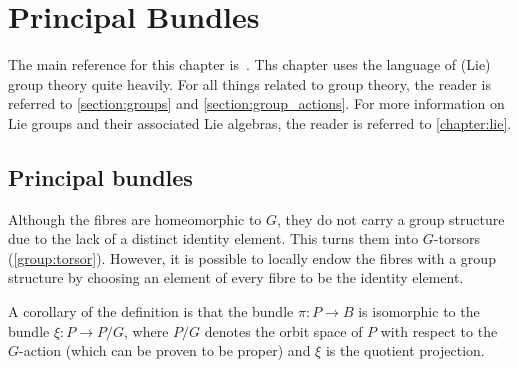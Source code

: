\chapter{Principal Bundles}\label{chapter:principal_bundles}

    The main reference for this chapter is~\citet{sontz_principal_2015}. Ths chapter uses the language of (Lie) group theory quite heavily. For all things related to group theory, the reader is referred to \cref{section:groups} and \cref{section:group_actions}. For more information on Lie groups and their associated Lie algebras, the reader is referred to \cref{chapter:lie}.

    \minitoc

\section{Principal bundles}

    \begin{remark}[$G$-torsor]\label{bundle:fibre_torsor}
        Although the fibres are homeomorphic to $G$, they do not carry a group structure due to the lack of a distinct identity element. This turns them into $G$-torsors (\cref{group:torsor}). However, it is possible to locally endow the fibres with a group structure by choosing an element of every fibre to be the identity element.
    \end{remark}

    \begin{property}
        A corollary of the definition is that the bundle $\pi:P\rightarrow B$ is isomorphic to the bundle $\xi:P\rightarrow P/G$, where $P/G$ denotes the orbit space of $P$ with respect to the $G$-action (which can be proven to be proper) and $\xi$ is the quotient projection.
    \end{property}

